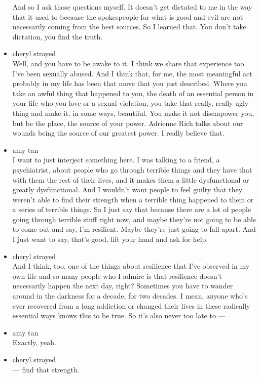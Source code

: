 \begin{itemize}
  And so I ask those questions myself. It doesn't get dictated to me in
  the way that it used to because the spokespeople for what is good and
  evil are not necessarily coming from the best sources. So I learned
  that. You don't take dictation, you find the truth.
\item
  cheryl strayed\\
  Well, and you have to be awake to it. I think we share that experience
  too. I've been sexually abused. And I think that, for me, the most
  meaningful act probably in my life has been that move that you just
  described. Where you take an awful thing that happened to you, the
  death of an essential person in your life who you love or a sexual
  violation, you take that really, really ugly thing and make it, in
  some ways, beautiful. You make it not disempower you, but be the
  place, the source of your power. Adrienne Rich talks about our wounds
  being the source of our greatest power. I really believe that.
\item
  amy tan\\
  I want to just interject something here. I was talking to a friend, a
  psychiatrist, about people who go through terrible things and they
  have that with them the rest of their lives, and it makes them a
  little dysfunctional or greatly dysfunctional. And I wouldn't want
  people to feel guilty that they weren't able to find their strength
  when a terrible thing happened to them or a series of terrible things.
  So I just say that because there are a lot of people going through
  terrible stuff right now, and maybe they're not going to be able to
  come out and say, I'm resilient. Maybe they're just going to fall
  apart. And I just want to say, that's good, lift your hand and ask for
  help.
\item
  cheryl strayed\\
  And I think, too, one of the things about resilience that I've
  observed in my own life and so many people who I admire is that
  resilience doesn't necessarily happen the next day, right? Sometimes
  you have to wander around in the darkness for a decade, for two
  decades. I mean, anyone who's ever recovered from a long addiction or
  changed their lives in these radically essential ways knows this to be
  true. So it's also never too late to ---
\item
  amy tan\\
  Exactly, yeah.
\item
  cheryl strayed\\
  --- find that strength.

\end{itemize}
